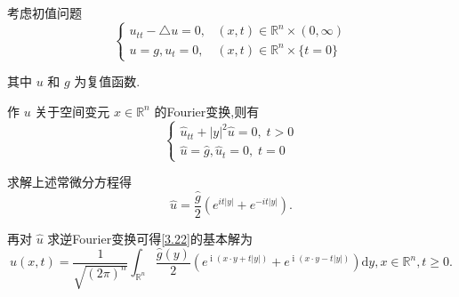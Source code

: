 \documentclass[lang=cn,newtx,10pt,scheme=chinese,thmcnt=chapter]{elegantbook}
\newcommand{\dif}{\mathrm{d}}
\newcommand{\ci}{\operatorname{i}}
\begin{document}
\begin{example}[波动方程的基本解] 考虑初值问题
\begin{equation}
\left\{  \begin{array}{ll} {u}_{tt} - \bigtriangleup u = 0, & \left( {x,t}\right)  \in  {\mathbb{R}}^{n} \times  \left( {0,\infty }\right) \\  u = g,{u}_{t} = 0, & \left( {x,t}\right)  \in  {\mathbb{R}}^{n} \times  \{ t = 0\}  \end{array}\right.  \label{3.22}
\end{equation}

其中 \(u\) 和 \(g\) 为复值函数.
\end{example}
\begin{solution}
    作 \(u\) 关于空间变元 \(x \in  {\mathbb{R}}^{n}\) 的Fourier变换,则有
\begin{equation}
\left\{  \begin{matrix} {\widehat{u}}_{tt} + {\left| y\right| }^{2}\widehat{u} = 0,\;t > 0 \\  \widehat{u} = \widehat{g},{\widehat{u}}_{t} = 0,\;t = 0 \end{matrix}\right.  \label{3.23}
\end{equation}

求解上述常微分方程得
\begin{equation*}
\widehat{u} = \frac{\widehat{g}}{2}\left( {{e}^{{it}\left| y\right| } + {e}^{-{it}\left| y\right| }}\right) .
\end{equation*}

再对 \(\widehat{u}\) 求逆Fourier变换可得\ref{3.22}的基本解为
\begin{equation*}
u\left( {x,t}\right)  = \frac{1}{\sqrt{{\left( 2\pi \right) }^{n}}}{\int }_{{\mathbb{R}}^{n}}\frac{\widehat{g}\left( y\right) }{2}\left( {{e}^{\ci\left( {x \cdot  y + t\left| y\right| }\right) } + {e}^{\ci\left( {x \cdot  y - t\left| y\right| }\right) }}\right) {\dif y},x \in  {\mathbb{R}}^{n},t \geq  0.
\end{equation*}

\end{solution}
\end{document}
